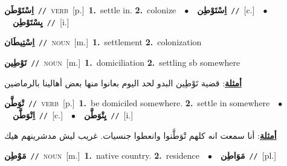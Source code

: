 \documentclass[10pt,a4paper,twoside]{article} %
\begin{document}
\begin{multicols}{2}
{\setlength\topsep{0pt}\textbf{\foreignlanguage{arabic}{اِسْتَوْطَن}}\ {\color{gray}\texttt{//}\color{black}}\ \textsc{verb}\ [p.]\ \textbf{1.}~settle in.  \textbf{2.}~colonize\ \ $\bullet$\ \ \setlength\topsep{0pt}\textbf{\foreignlanguage{arabic}{اِسْتَوْطِن}}\ {\color{gray}\texttt{//}\color{black}}\ [c.]\ \ $\bullet$\ \ \setlength\topsep{0pt}\textbf{\foreignlanguage{arabic}{يِسْتَوْطِن}}\ {\color{gray}\texttt{//}\color{black}}\ [i.]\ } \vspace{2mm}

{\setlength\topsep{0pt}\textbf{\foreignlanguage{arabic}{اِسْتِيطَان}}\ {\color{gray}\texttt{//}\color{black}}\ \textsc{noun}\ [m.]\ \textbf{1.}~settlement  \textbf{2.}~colonization\ } \vspace{2mm}

{\setlength\topsep{0pt}\textbf{\foreignlanguage{arabic}{تَوْطِين}}\ {\color{gray}\texttt{//}\color{black}}\ \textsc{noun}\ [m.]\ \textbf{1.}~domiciliation  \textbf{2.}~settling sb somewhere\  \begin{flushright}\color{gray}\foreignlanguage{arabic}{\textbf{\underline{\foreignlanguage{arabic}{أمثلة}}}: قضية تَوْطِين البدو لحد اليوم بعانوا منها بعض أهالينا بالرماضين}\end{flushright}\color{black}} \vspace{2mm}

{\setlength\topsep{0pt}\textbf{\foreignlanguage{arabic}{تْوَطَّن}}\ {\color{gray}\texttt{//}\color{black}}\ \textsc{verb}\ [p.]\ \textbf{1.}~be domiciled somewhere.  \textbf{2.}~settle in somewhere\ \ $\bullet$\ \ \setlength\topsep{0pt}\textbf{\foreignlanguage{arabic}{اِتْوَطَّن}}\ {\color{gray}\texttt{//}\color{black}}\ [c.]\ \ $\bullet$\ \ \setlength\topsep{0pt}\textbf{\foreignlanguage{arabic}{يِتْوَطَّن}}\ {\color{gray}\texttt{//}\color{black}}\ [i.]\  \begin{flushright}\color{gray}\foreignlanguage{arabic}{\textbf{\underline{\foreignlanguage{arabic}{أمثلة}}}: أنا سمعت انه كلهم تْوَطَّنوا وانعطوا جنسيات. غريب ليش مدشرينهم هيك}\end{flushright}\color{black}} \vspace{2mm}

{\setlength\topsep{0pt}\textbf{\foreignlanguage{arabic}{مَوْطِن}}\ {\color{gray}\texttt{//}\color{black}}\ \textsc{noun}\ [m.]\ \textbf{1.}~native country.  \textbf{2.}~residence\ \ $\bullet$\ \ \setlength\topsep{0pt}\textbf{\foreignlanguage{arabic}{مَوَاطِن}}\ {\color{gray}\texttt{//}\color{black}}\ [pl.]\ } \vspace{2mm}


\end{multicols}
\end{document}
